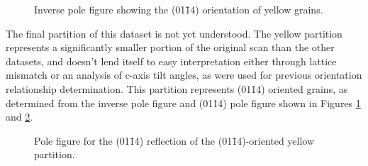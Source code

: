 \documentclass[12pt,%
              twoside,
               letterpaper]{uiothesis}
\begin{document}
\begin{figure}
\centering
\caption[Inverse pole figure showing orientation of  yellow grains]{%
Inverse pole figure showing the (01\={1}4) orientation of yellow grains.}
\label{fig:yellowipf}

\end{figure}
The final partition of this dataset is not yet understood. The yellow partition represents
a significantly smaller portion of the original scan than the other datasets, and doesn't
lend itself to easy interpretation either through lattice mismatch or an analysis of
c-axis tilt angles, as were used for previous orientation relationship determination. This
partition represents (01\={1}4) oriented grains, as determined from the inverse pole
figure and (01\={1}4) pole figure shown in Figures \ref{fig:yellowipf} and
\ref{fig:yellow0114pole}.

\begin{figure}
\begin{center}
\caption[(01\={1}4) pole figure for yellow grains]{%
	Pole figure for the (01\={1}4) reflection of the (01\={1}4)-oriented yellow
partition.}
\label{fig:yellow0114pole}
\end{center}
\end{figure}
			
\end{document}

